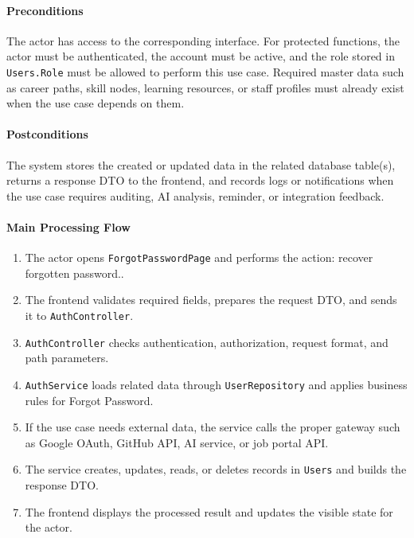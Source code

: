 \paragraph{Preconditions}

The actor has access to the corresponding interface. For protected functions, the actor must be authenticated, the account must be active, and the role stored in \texttt{Users.Role} must be allowed to perform this use case. Required master data such as career paths, skill nodes, learning resources, or staff profiles must already exist when the use case depends on them.

\paragraph{Postconditions}

The system stores the created or updated data in the related database table(s), returns a response DTO to the frontend, and records logs or notifications when the use case requires auditing, AI analysis, reminder, or integration feedback.

\paragraph{Main Processing Flow}

\begin{enumerate}
    \item The actor opens \texttt{ForgotPasswordPage} and performs the action: recover forgotten password..
    \item The frontend validates required fields, prepares the request DTO, and sends it to \texttt{AuthController}.
    \item \texttt{AuthController} checks authentication, authorization, request format, and path parameters.
    \item \texttt{AuthService} loads related data through \texttt{UserRepository} and applies business rules for Forgot Password.
    \item If the use case needs external data, the service calls the proper gateway such as Google OAuth, GitHub API, AI service, or job portal API.
    \item The service creates, updates, reads, or deletes records in \texttt{Users} and builds the response DTO.
    \item The frontend displays the processed result and updates the visible state for the actor.
\end{enumerate}

